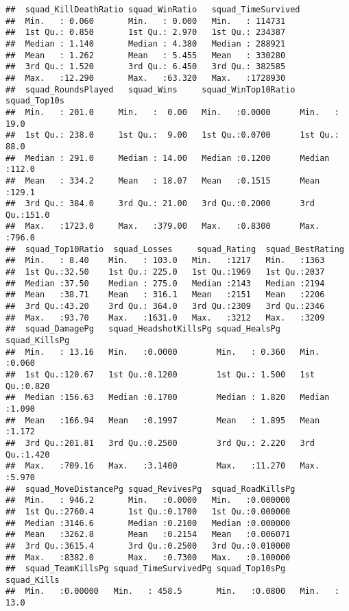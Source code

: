 \documentclass[]{article}
\begin{document}
\begin{verbatim}
##  squad_KillDeathRatio squad_WinRatio   squad_TimeSurvived
##  Min.   : 0.060       Min.   : 0.000   Min.   : 114731   
##  1st Qu.: 0.850       1st Qu.: 2.970   1st Qu.: 234387   
##  Median : 1.140       Median : 4.380   Median : 288921   
##  Mean   : 1.262       Mean   : 5.455   Mean   : 330280   
##  3rd Qu.: 1.520       3rd Qu.: 6.450   3rd Qu.: 382585   
##  Max.   :12.290       Max.   :63.320   Max.   :1728930   
##  squad_RoundsPlayed   squad_Wins     squad_WinTop10Ratio  squad_Top10s  
##  Min.   : 201.0     Min.   :  0.00   Min.   :0.0000      Min.   : 19.0  
##  1st Qu.: 238.0     1st Qu.:  9.00   1st Qu.:0.0700      1st Qu.: 88.0  
##  Median : 291.0     Median : 14.00   Median :0.1200      Median :112.0  
##  Mean   : 334.2     Mean   : 18.07   Mean   :0.1515      Mean   :129.1  
##  3rd Qu.: 384.0     3rd Qu.: 21.00   3rd Qu.:0.2000      3rd Qu.:151.0  
##  Max.   :1723.0     Max.   :379.00   Max.   :0.8300      Max.   :796.0  
##  squad_Top10Ratio  squad_Losses     squad_Rating  squad_BestRating
##  Min.   : 8.40    Min.   : 103.0   Min.   :1217   Min.   :1363    
##  1st Qu.:32.50    1st Qu.: 225.0   1st Qu.:1969   1st Qu.:2037    
##  Median :37.50    Median : 275.0   Median :2143   Median :2194    
##  Mean   :38.71    Mean   : 316.1   Mean   :2151   Mean   :2206    
##  3rd Qu.:43.20    3rd Qu.: 364.0   3rd Qu.:2309   3rd Qu.:2346    
##  Max.   :93.70    Max.   :1631.0   Max.   :3212   Max.   :3209    
##  squad_DamagePg   squad_HeadshotKillsPg squad_HealsPg    squad_KillsPg  
##  Min.   : 13.16   Min.   :0.0000        Min.   : 0.360   Min.   :0.060  
##  1st Qu.:120.67   1st Qu.:0.1200        1st Qu.: 1.500   1st Qu.:0.820  
##  Median :156.63   Median :0.1700        Median : 1.820   Median :1.090  
##  Mean   :166.94   Mean   :0.1997        Mean   : 1.895   Mean   :1.172  
##  3rd Qu.:201.81   3rd Qu.:0.2500        3rd Qu.: 2.220   3rd Qu.:1.420  
##  Max.   :709.16   Max.   :3.1400        Max.   :11.270   Max.   :5.970  
##  squad_MoveDistancePg squad_RevivesPg  squad_RoadKillsPg 
##  Min.   : 946.2       Min.   :0.0000   Min.   :0.000000  
##  1st Qu.:2760.4       1st Qu.:0.1700   1st Qu.:0.000000  
##  Median :3146.6       Median :0.2100   Median :0.000000  
##  Mean   :3262.8       Mean   :0.2154   Mean   :0.006071  
##  3rd Qu.:3615.4       3rd Qu.:0.2500   3rd Qu.:0.010000  
##  Max.   :8382.0       Max.   :0.7300   Max.   :0.100000  
##  squad_TeamKillsPg squad_TimeSurvivedPg squad_Top10sPg    squad_Kills    
##  Min.   :0.00000   Min.   : 458.5       Min.   :0.0800   Min.   :  13.0  

\end{verbatim}
\end{document}
